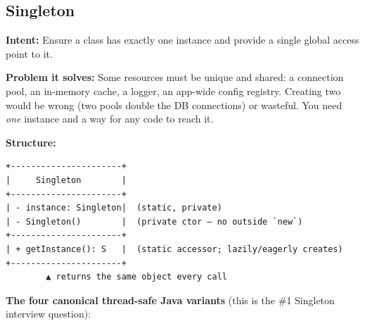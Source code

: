 \documentclass[11pt]{article}
\begin{document}
\subsection{Singleton}\label{singleton}

\textbf{Intent:} Ensure a class has exactly one instance and provide a single global access point to it.

\textbf{Problem it solves:} Some resources must be unique and shared: a connection pool, an in-memory cache, a logger, an app-wide config registry. Creating two would be wrong (two pools double the DB connections) or wasteful. You need \emph{one} instance and a way for any code to reach it.

\textbf{Structure:}

\setcodelang{}

\begin{verbatim}
+----------------------+
|     Singleton        |
+----------------------+
| - instance: Singleton|  (static, private)
| - Singleton()        |  (private ctor — no outside `new`)
+----------------------+
| + getInstance(): S   |  (static accessor; lazily/eagerly creates)
+----------------------+
        ▲ returns the same object every call
\end{verbatim}

\textbf{The four canonical thread-safe Java variants} (this is the \#1 Singleton interview question):

\end{document}
